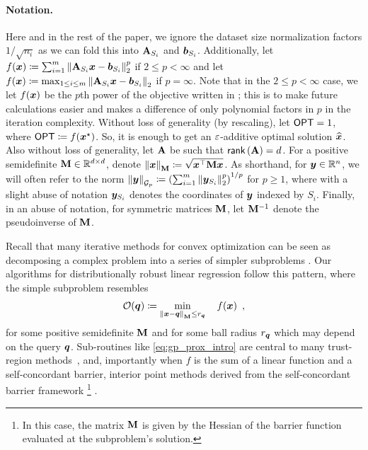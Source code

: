 \paragraph{Notation.} Here and in the rest of the paper, we ignore the dataset size normalization factors $1/\sqrt{n_i}$ as we can fold this into $\mathbf{A}_{S_i}$ and $\bm{b}_{S_i}$. Additionally, let $f(\bm{x}) \coloneqq \sum_{i=1}^m \left\lVert \mathbf{A}_{S_i}\bm{x}-\bm{b}_{S_i} \right\rVert_2^p$ if $2 \le p < \infty$ and let $f(\bm{x}) \coloneqq \max_{1 \le i \le m} \left\lVert \mathbf{A}_{S_i}\bm{x}-\bm{b}_{S_i} \right\rVert_2$ if $p=\infty$. Note that in the $2 \le p < \infty$ case, we let $f(\bm{x})$ be the $p$th power of the objective written in ; this is to make future calculations easier and makes a difference of only polynomial factors in $p$ in the iteration complexity. Without loss of generality (by rescaling), let $\mathsf{OPT} = 1$, where $\mathsf{OPT} \coloneqq f(\bm{x}^{\star})$. So, it is enough to get an $\varepsilon$-additive optimal solution $\widehat{\bm{x}}$. Also without loss of generality, let $\mathbf{A}$ be such that $\mathsf{rank}\left(\mathbf{A}\right)=d$. For a positive semidefinite $\mathbf{M}\in\mathbb{R}^{d\times d}$, denote $\left\lVert \bm{x} \right\rVert_{\mathbf{M}} \coloneqq \sqrt{\bm{x}^{\top}\mathbf{M}\bm{x}}$. As shorthand, for $\bm{y}\in\mathbb{R}^n$, we will often refer to the norm $\left\lVert \bm{y} \right\rVert_{\mathcal{G}_{p}} \coloneqq \left(\sum_{i=1}^m \left\lVert \bm{y}_{S_i} \right\rVert_2^p\right)^{1/p}$ for $p \ge 1$, where with a slight abuse of notation $\bm{y}_{S_i}$ denotes the coordinates of $\bm{y}$ indexed by $S_i$. Finally, in an abuse of notation, for symmetric matrices $\mathbf{M}$, let $\mathbf{M}^{-1}$ denote the pseudoinverse of $\mathbf{M}$.

Recall that many iterative methods for convex optimization can be seen as decomposing a complex problem into a series of simpler subproblems \citep{nw06}. Our algorithms for distributionally robust linear regression follow this pattern, where the simple subproblem resembles
\begin{align}
    \mathcal{O}(\bm{q}) \coloneqq \min_{\left\lVert \bm{x}-\bm{q} \right\rVert_{\mathbf{M}} \le r_{\bm{q}}}\quad f(\bm{x})\enspace,\label{eq:gp_prox_intro}
\end{align}
for some positive semidefinite $\mathbf{M}$ and for some ball radius $r_{\bm{q}}$ which may depend on the query $\bm{q}$. Sub-routines like \eqref{eq:gp_prox_intro} are central to many trust-region methods~\citep{conn2000trust, nw06}, and, importantly when $f$ is the sum of a linear function and a self-concordant barrier, interior point methods derived from the self-concordant barrier framework \footnote{In this case, the matrix $\mathbf{M}$ is given by the Hessian of the barrier function evaluated at the subproblem's solution.} \citep{nn94}.


